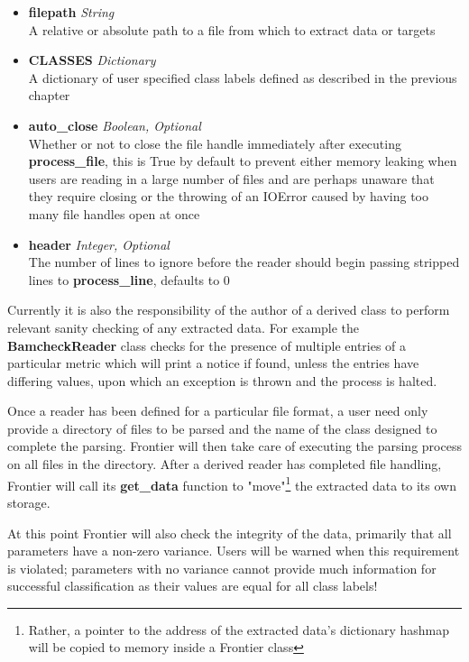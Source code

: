 \begin{itemize}
    \item \textbf{filepath} \textit{String}\hfill\\
        A relative or absolute path to a file from which to extract data or
        targets
    \item \textbf{CLASSES} \textit{Dictionary}\hfill\\
        A dictionary of user specified class labels defined as described in
        the previous chapter
    \item \textbf{auto\_close} \textit{Boolean, Optional}\hfill\\
        Whether or not to close the file handle immediately after executing
        \textbf{process\_file}, this is True by default to prevent either memory
        leaking when users are reading in a large number of files and are
        perhaps unaware that they require closing or the throwing of an IOError
        caused by having too many file handles open at once
    \item \textbf{header} \textit{Integer, Optional}\hfill\\
        The number of lines to ignore before the reader should begin
        passing stripped lines to \textbf{process\_line}, defaults to 0
\end{itemize}

Currently it is also the responsibility of the author of a derived class to
perform relevant sanity checking of any extracted data. For example the
\textbf{BamcheckReader} class checks for the presence of multiple entries of a
particular metric which will print a notice if found, unless the entries have
differing values, upon which an exception is thrown and the process is halted.

Once a reader has been defined for a particular file format, a user need only
provide a directory of files to be parsed and the name of the class designed to
complete the parsing. Frontier will then take care of executing the parsing
process on all files in the directory. After a derived reader has completed file
handling, Frontier will call its \textbf{get\_data} function to
"move"\footnote{Rather, a pointer to the address of the extracted data's
dictionary hashmap will be copied to memory inside a Frontier class} the
extracted data to its own storage.

At this point Frontier will also check the integrity of the data, primarily that
all parameters have a non-zero variance. Users will be warned when this
requirement is violated; parameters with no variance cannot provide much
information for successful classification as their values are equal for all
class labels!

